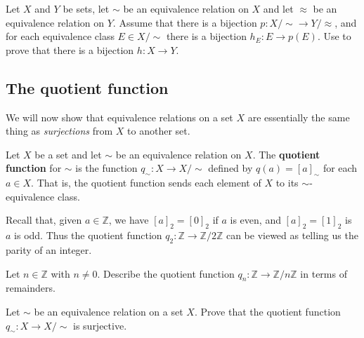 \begin{exercise}
\label{exBijectionOfQuotientsAndClassesInducesBijectionOfSets}
Let $X$ and $Y$ be sets, let $\sim$ be an equivalence relation on $X$ and let $\approx$ be an equivalence relation on $Y$. Assume that there is a bijection $p : X/{\sim} \to Y/{\approx}$, and for each equivalence class $E \in X/{\sim}$ there is a bijection $h_E : E \to p(E)$. Use  to prove that there is a bijection $h : X \to Y$.
\end{exercise}

\subsection*{The quotient function}

We will now show that equivalence relations on a set $X$ are essentially the same thing as \textit{surjections} from $X$ to another set.

\begin{definition}
\label{defQuotientFunction}
Let $X$ be a set and let $\sim$ be an equivalence relation on $X$. The \textbf{quotient function} for $\sim$ is the function $q_{\sim} : X \to X/{\sim}$ defined by $q(a) = [a]_{\sim}$ for each $a \in X$. That is, the quotient function sends each element of $X$ to its $\sim$-equivalence class.
\end{definition}

\begin{example}
Recall that, given $a \in \mathbb{Z}$, we have $[a]_2 = [0]_2$ if $a$ is even, and $[a]_2 = [1]_2$ is $a$ is odd. Thus the quotient function $q_2 : \mathbb{Z} \to \mathbb{Z}/2\mathbb{Z}$ can be viewed as telling us the parity of an integer.
\end{example}

\begin{exercise}
Let $n \in \mathbb{Z}$ with $n \ne 0$. Describe the quotient function $q_n : \mathbb{Z} \to \mathbb{Z}/n\mathbb{Z}$ in terms of remainders.
\end{exercise}

\begin{exercise}
\label{exQuotientFunctionIsSurjective}
Let $\sim$ be an equivalence relation on a set $X$. Prove that the quotient function $q_{\sim} : X \to X/{\sim}$ is surjective.
\end{exercise}

